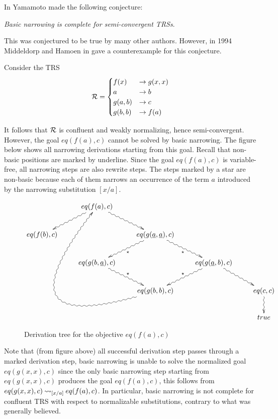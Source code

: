 In \cite{10.1007/3-540-51564-X_51} Yamamoto made the following conjecture:
\begin{center}
    \textit{Basic narrowing is complete for semi-convergent TRSs}.
\end{center}
This was conjectured to be true by many other authors. However, in 1994 Middeldorp and Hamoen in \cite{Middeldorp1994} gave a counterexample for this conjecture.

Consider the TRS
\begin{displaymath}
    \mathcal{R} =
	\begin{cases}
		f(x) & \rightarrow g(x,x)                               \\
        a & \rightarrow b \\
        g(a,b) & \rightarrow c \\
        g(b,b) & \rightarrow f(a)
	\end{cases}
\end{displaymath}

It follows that $\mathcal{R}$ is confluent and weakly normalizing, hence semi-convergent. However, the goal $eq(f(a),c)$ cannot be solved by basic narrowing. The figure below shows all narrowing derivations starting from this goal. Recall that non-basic positions are marked by underline. Since the goal $eq(f(a),c)$ is variable-free, all narrowing steps are also rewrite steps. The steps marked by a star are non-basic because each of them narrows an occurrence of the term $a$ introduced by the narrowing substitution $[x / a]$.
\begin{figure}[!ht]
    \begin{displaymath}
        \xymatrix{
            & eq(f(a),c)\ar@{~>}[dr] \ar@{~>}[dl] &  &  &  \\
            eq(f(b),c) &  & eq(g(\underline{a},\underline{a}), c) \ar@{~>}[dl]^{\star} \ar@{~>}[dr]_{\star} &  & \\
            & eq(g(b,\underline{a}),c) \ar@{~>}[dr]^{\star} & & eq(g(\underline{a},b),c) \ar@{~>}[dl]_{\star} \ar@{~>}[dr] &\\
            & & eq(g(b,b),c) \ar@{~>}@/^10pc/[lluuur] & & eq(c,c) \ar@{~>}[d]\\
            & &  & & true
        }
    \end{displaymath}
    \caption{Derivation tree for the objective $eq(f(a),c)$}
    \label{figure:counterexample}
\end{figure}

Note that (from figure above) all successful derivation step passes through a marked derivation step, basic narrowing is unable to solve the normalized goal $eq(g(x,x),c)$ since the only basic narrowing step starting from $eq(g(x,x),c)$ produces the goal $eq(f(a),c)$, this follows from  $eq(g(x,x),c) \mathbin{\rightsquigarrow}_{[x/a]} eq(f(a),c)$. In particular, basic narrowing is not complete for confluent TRS with respect to normalizable substitutions, contrary to what was generally believed.
